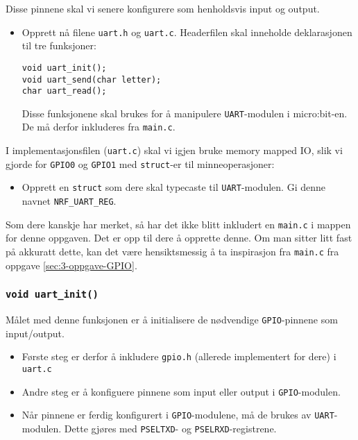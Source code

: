  Disse pinnene skal vi senere konfigurere som henholdsvis input og output.
 
 \begin{itemize}
     \item Opprett nå filene \verb|uart.h| og \verb|uart.c|. Headerfilen skal inneholde deklarasjonen til tre funksjoner:

\begin{lstlisting}
void uart_init();
void uart_send(char letter);
char uart_read();
\end{lstlisting} 
Disse funksjonene skal brukes for å manipulere \verb|UART|-modulen i micro:bit-en. De må derfor inkluderes fra \verb|main.c|.
 \end{itemize}
 
 I implementasjonsfilen (\verb|uart.c|) skal vi igjen bruke memory mapped IO, slik vi gjorde for \verb|GPIO0| og \verb|GPIO1| med \verb|struct|-er til minneoperasjoner:
 
 \begin{itemize}
    \item Opprett en \verb|struct| som dere skal typecaste til \verb|UART|-modulen. Gi denne navnet \verb|NRF_UART_REG|.
\end{itemize}

Som dere kanskje har merket, så har det ikke blitt inkludert en \verb|main.c| i mappen for denne oppgaven. Det er opp til dere å opprette denne. Om man sitter litt fast på akkuratt dette, kan det være hensiktsmessig å ta inspirasjon fra \verb|main.c| fra oppgave \ref{sec:3-oppgave-GPIO}.





\cprotect\subsubsection{\lstinline{void uart_init()}}
Målet med denne funksjonen er å initialisere de nødvendige \verb|GPIO|-pinnene som input/output. 


\begin{itemize}
    \item Første steg er derfor å inkludere \verb|gpio.h| (allerede implementert for dere) i \verb|uart.c|
    \item Andre steg er å konfiguere pinnene som input eller output i \verb|GPIO|-modulen.
    \item Når pinnene er ferdig konfigurert i \verb|GPIO|-modulene, må de brukes av \verb|UART|-modulen. Dette gjøres med \verb|PSELTXD|- og \verb|PSELRXD|-registrene.
\end{itemize}



